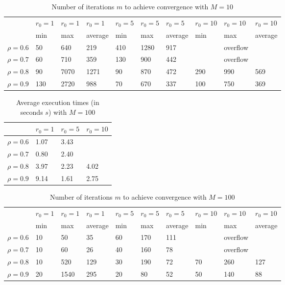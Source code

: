 \documentclass[a4paper,11pt,openright]{report}
\begin{document}
\begin{table}[H]
\centering
\addtolength{\leftskip}{-1.5cm}
\addtolength{\rightskip}{-1.5cm}
\begin{tabular}{|c|lllllllll|}
\hline
$ $ & $r_0 = 1$ & $r_0 = 1$ & $r_0 = 1$ & $r_0 = 5$ & $r_0 = 5$ & $r_0 = 5$ & $r_0 = 10$ & $r_0 = 10$ & $r_0 = 10$  \\
$ $ & min & max & average & min & max & average & min & max & average \\ 
\hline
$\rho = 0.6$ & 50 & 640 & 219 & 410 & 1280 & 917 &  & overflow &  \\

$\rho = 0.7$ & 60 & 710 & 359 & 130 & 900 & 442 &  & overflow &  \\

$\rho = 0.8$ & 90 & 7070 & 1271 & 90 & 870 & 472 & 290 & 990 & 569 \\

$\rho = 0.9$ & 130 & 2720 & 988 & 70 & 670 & 337 & 100 & 750 & 369\\
\hline
\end{tabular}
\caption{Number of iterations $m$ to achieve convergence with $M = 10$}
\end{table}
\begin{table}[H]
\centering
\addtolength{\leftskip}{-1.5cm}
\addtolength{\rightskip}{-1.5cm}
\begin{tabular}{|c|lll|}
\hline
$ $ & $r_0 = 1$ & $r_0 = 5$ & $r_0 = 10$ \\
\hline
$\rho = 0.6$ & 1.07 & 3.43 &  \\

$\rho = 0.7$ & 0.80 & 2.40 &  \\

$\rho = 0.8$ & 3.97 & 2.23 & 4.02 \\

$\rho = 0.9$ & 9.14 & 1.61 & 2.75 \\
\hline
\end{tabular}
\caption{Average execution
 times (in seconds $s$) with $M = 100$}
\end{table}
\begin{table}[H]
\centering
\addtolength{\leftskip}{-1.5cm}
\addtolength{\rightskip}{-1.5cm}
\begin{tabular}{|c|lllllllll|}
\hline
$ $ & $r_0 = 1$ & $r_0 = 1$ & $r_0 = 1$ & $r_0 = 5$ & $r_0 = 5$ & $r_0 = 5$ & $r_0 = 10$ & $r_0 = 10$ & $r_0 = 10$  \\
$ $ & min & max & average & min & max & average & min & max & average \\ 
\hline
$\rho = 0.6$ & 10 & 50 & 35 & 60 & 170 & 111 &  & overflow &  \\

$\rho = 0.7$ & 10 & 60 & 26 & 40 & 160 & 78 &  & overflow &  \\

$\rho = 0.8$ & 10 & 520 & 129 & 30 & 190 & 72 & 70 & 260 & 127 \\

$\rho = 0.9$ & 20 & 1540 & 295 & 20 & 80 & 52 & 50 & 140 & 88\\
\hline
\end{tabular}
\caption{Number of iterations $m$ to achieve convergence with $M = 100$}
\end{table}
\end{document}
